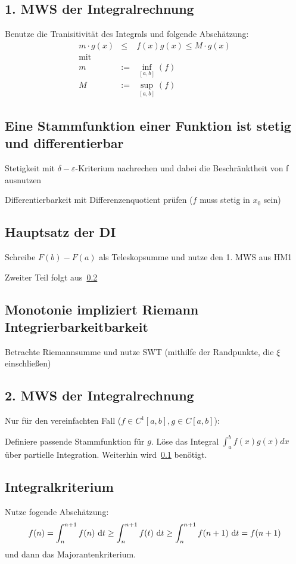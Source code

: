 \subsection{1. MWS der Integralrechnung}\label{HM2Int:1MWS}
Benutze die Tranisitivität des Integrals und folgende Abschätzung:
\begin{eqnarray*}
 m \cdot g(x) &\leq& f(x)g(x) \leq M \cdot g(x)\\
 \text{mit}\\
 m &:=&\inf\limits_{[a,b]}(f)\\
 M &:=&\sup\limits_{[a,b]}(f)
\end{eqnarray*}
\subsection{Eine Stammfunktion einer Funktion ist stetig und differentierbar}\label{HM2Int:StFkt}
Stetigkeit mit $\delta-\varepsilon$-Kriterium nachrechen und dabei die Beschränktheit von
f ausnutzen

Differentierbarkeit mit Differenzenquotient prüfen ($f$ muss stetig in $x_0$ sein)

\subsection{Hauptsatz der DI}
Schreibe $F(b) - F(a)$ als Teleskopsumme und nutze den 1. MWS aus HM1

Zweiter Teil folgt aus~\ref{HM2Int:StFkt}

\subsection{Monotonie impliziert Riemann Integrierbarkeitbarkeit}
Betrachte Riemannsumme und nutze SWT (mithilfe der Randpunkte, die $\xi$ einschließen)

\subsection{2. MWS der Integralrechnung}
Nur für den vereinfachten Fall ($f \in C^1[a,b], g \in C[a,b]$):

Definiere passende Stammfunktion für $g$. Löse das Integral $\int_a^b f(x)g(x) dx$
über partielle Integration. Weiterhin wird~\ref{HM2Int:1MWS} benötigt.

\subsection{Integralkriterium}
Nutze fogende Abschätzung:
\begin{equation*}
 f(n) = \int_n^{n+1}f(n)\text{ d}t \geq \int_n^{n+1}f(t)\text{ d}t \geq \int_n^{n+1}f(n+1)\text{ d}t = f(n+1)
\end{equation*}
und dann das Majorantenkriterium.

